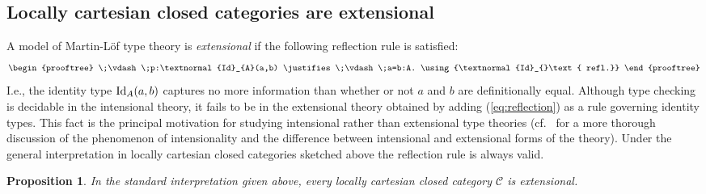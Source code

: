 \documentclass[12pt]{amsart}
\newcommand{\judge}[2]{#1\;\vdash\;#2}
\newcommand{\id}[1]{\textnormal{Id}_{#1}}
\newtheorem{proposition}[theorem]{Proposition}
\theoremstyle{definition}
\theoremstyle{remark}
\begin{document}
\subsection{Locally cartesian closed categories are extensional}

A model of Martin-L\"{o}f type theory is
\emph{extensional} if the following reflection
rule is satisfied:
\begin{align}\label{eq:reflection}
  \begin{prooftree}
    \judge{}{p:\id{A}(a,b)}
    \justifies
    \judge{}{a=b:A}.
    \using{\id{}\text{ refl.}}
  \end{prooftree}
\end{align}
I.e., the identity type
$\id{A}(a,b)$ captures no more information than whether or not $a$ and
$b$ are definitionally equal.  Although type checking is decidable in
the intensional theory, it fails to be in the extensional theory
obtained by adding (\ref{eq:reflection}) as a rule governing identity types.
This fact is the principal motivation for studying intensional rather
than extensional type theories (cf.~\cite{Streicher:IIITT} for a more
thorough discussion of the phenomenon of intensionality and the
difference between intensional and extensional forms of the theory).
Under the general interpretation in
locally cartesian closed categories
sketched above the reflection rule is always valid.
\begin{proposition}
  In the standard interpretation given above, every locally cartesian
  closed category $\mathcal{C}$ is extensional. 
\end{proposition}
\end{document}
